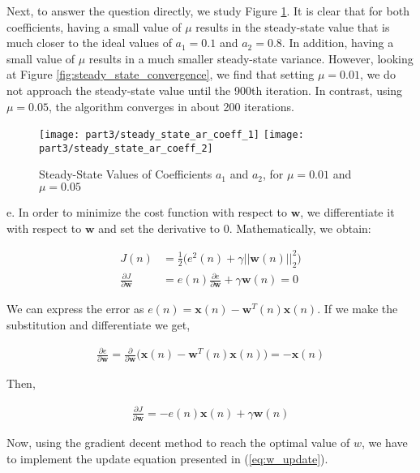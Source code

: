 \noindent{}Next, to answer the question directly, we study Figure \ref{fig:steady_state_AR}. It is clear that for both coefficients, having a small value of $\mu$ results in the steady-state value that is much closer to the ideal values of $a_1=0.1$ and $a_2=0.8$. In addition, having a small value of $\mu$ results in a much smaller steady-state variance. However, looking at Figure \ref{fig:steady_state_convergence}, we find that setting $\mu=0.01$, we do not approach the steady-state value until the 900th iteration. In contrast, using $\mu=0.05$, the algorithm converges in about 200 iterations.

\begin{figure}[H]
\centering{}
\texttt{[image: part3/steady\_state\_ar\_coeff\_1]}
\texttt{[image: part3/steady\_state\_ar\_coeff\_2]}
\caption{Steady-State Values of Coefficients $a_1$ and $a_2$, for $\mu=0.01$ and $\mu=0.05$}
\label{fig:steady_state_AR}
\end{figure}

\noindent{}e. In order to minimize the cost function with respect to $\textbf{w}$, we differentiate it with respect to $\textbf{w}$ and set the derivative to 0. Mathematically, we obtain:

\begin{align}
J(n) &= \frac{1}{2}\Bigg(e^2(n)+\gamma||\textbf{w}(n)||_2^2\Bigg) \label{eq:cost_func}\\ 
\frac{\partial J}{\partial \textbf{w}} &= e(n)\frac{\partial e}{\partial \textbf{w}} + \gamma \textbf{w}(n) = 0 \nonumber
\end{align}

\noindent{}We can express the error as $e(n)=\textbf{x}(n) - \textbf{w}^T(n)\textbf{x}(n)$. If we make the substitution and differentiate we get,

\begin{align*}
\frac{\partial e}{\partial \textbf{w}} = \frac{\partial}{\partial \textbf{w}}\Bigg(\textbf{x}(n) - \textbf{w}^T(n)\textbf{x}(n)\Bigg) = -\textbf{x}(n)
\end{align*}

\noindent{}Then,

\begin{align*}
\frac{\partial J}{\partial \textbf{w}} = - e(n)\textbf{x}(n) +\gamma \textbf{w}(n)
\end{align*}

\noindent{}Now, using the gradient decent method to reach the optimal value of $w$, we have to implement the update equation presented in (\ref{eq:w_update}).

